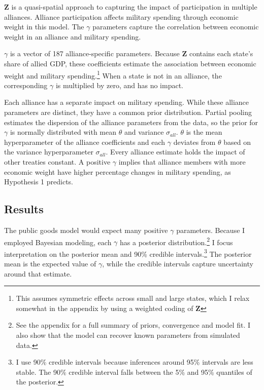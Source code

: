 \documentclass[12pt]{article}
\begin{document}
$\textbf{Z}$ is a quasi-spatial approach to capturing the impact of participation in multiple alliances.
Alliance participation affects military spending through economic weight in this model.  
The $\gamma$ parameters capture the correlation between economic weight in an alliance and military spending. 


$\gamma$ is a vector of 187 alliance-specific parameters.  
Because \textbf{Z} contains each state's share of allied GDP, these coefficients estimate the association between economic weight and military spending.\footnote{This assumes symmetric effects across small and large states, which I relax somewhat in the appendix by using a weighted coding of $\textbf{Z}$} 
When a state is not in an alliance, the corresponding $\gamma$ is multiplied by zero, and has no impact. 


Each alliance has a separate impact on military spending.
While these alliance parameters are distinct, they have a common prior distribution.
Partial pooling estimates the dispersion of the alliance parameters from the data, so the prior for $\gamma$ is normally distributed with mean $\theta$ and variance $\sigma_{all}$. 
$\theta$ is the mean hyperparameter of the alliance coefficients and each $\gamma$ deviates from $\theta$ based on the variance hyperparameter $\sigma_{all}$.
Every alliance estimate holds the impact of other treaties constant. 
A positive $\gamma$ implies that alliance members with more economic weight have higher percentage changes in military spending, as Hypothesis 1 predicts. 
    


\subsection{Results} 


The public goods model would expect many positive $\gamma$ parameters. 
Because I employed Bayesian modeling, each $\gamma$ has a posterior distribution.\footnote{See the appendix for a full summary of priors, convergence and model fit. I also show that the model can recover known parameters from simulated data.} 
I focus interpretation on the posterior mean and 90\% credible intervals.\footnote{I use 90\% credible intervals because inferences around 95\% intervals are less stable. The 90\% credible interval falls between the 5\% and 95\% quantiles of the posterior.}
The posterior mean is the expected value of $\gamma$, while the credible intervals capture uncertainty around that estimate.  
\end{document}
